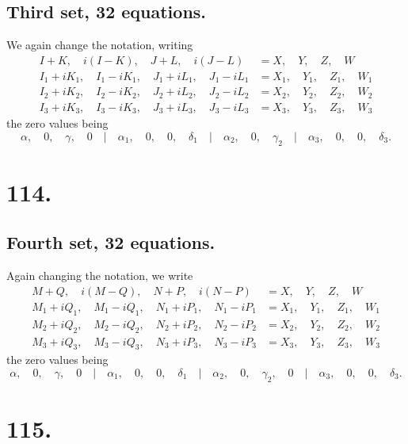 \documentclass[11pt,a4paper]{article}
\begin{document}
\subsection*{Third set, 32 equations.}

We again change the notation, writing
\begin{align*}
I+K, \quad i(I-K), \quad J+L, \quad i(J-L) &= X, \quad Y, \quad Z, \quad W \\
I_1+iK_1, \quad I_1-iK_1, \quad J_1+iL_1, \quad J_1-iL_1 &= X_1, \quad Y_1, \quad Z_1, \quad W_1 \\
I_2+iK_2, \quad I_2-iK_2, \quad J_2+iL_2, \quad J_2-iL_2 &= X_2, \quad Y_2, \quad Z_2, \quad W_2 \\
I_3+iK_3, \quad I_3-iK_3, \quad J_3+iL_3, \quad J_3-iL_3 &= X_3, \quad Y_3, \quad Z_3, \quad W_3
\end{align*}
the zero values being
\[
\alpha, \quad 0, \quad \gamma, \quad 0 \quad|\quad \alpha_1, \quad 0, \quad 0, \quad \delta_1 \quad|\quad \alpha_2, \quad 0, \quad \gamma_2 \quad|\quad \alpha_3, \quad 0, \quad 0, \quad \delta_3.
\]

\newpage
\section*{114.}
\label{sec:114}

\subsection*{Fourth set, 32 equations.}

Again changing the notation, we write
\begin{align*}
M+Q, \quad i(M-Q), \quad N+P, \quad i(N-P) &= X, \quad Y, \quad Z, \quad W \\
M_1+iQ_1, \quad M_1-iQ_1, \quad N_1+iP_1, \quad N_1-iP_1 &= X_1, \quad Y_1, \quad Z_1, \quad W_1 \\
M_2+iQ_2, \quad M_2-iQ_2, \quad N_2+iP_2, \quad N_2-iP_2 &= X_2, \quad Y_2, \quad Z_2, \quad W_2 \\
M_3+iQ_3, \quad M_3-iQ_3, \quad N_3+iP_3, \quad N_3-iP_3 &= X_3, \quad Y_3, \quad Z_3, \quad W_3
\end{align*}
the zero values being
\[
\alpha, \quad 0, \quad \gamma, \quad 0 \quad|\quad \alpha_1, \quad 0, \quad 0, \quad \delta_1 \quad|\quad \alpha_2, \quad 0, \quad \gamma_2, \quad 0 \quad|\quad \alpha_3, \quad 0, \quad 0, \quad \delta_3.
\]

\newpage
\section*{115.}
\label{sec:115}
\end{document}
